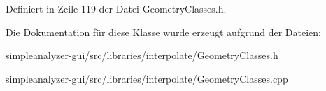 Definiert in Zeile 119 der Datei Geometry\-Classes.\-h.



Die Dokumentation für diese Klasse wurde erzeugt aufgrund der Dateien\-:\begin{DoxyCompactItemize}
\item 
simpleanalyzer-\/gui/src/libraries/interpolate/Geometry\-Classes.\-h\item 
simpleanalyzer-\/gui/src/libraries/interpolate/Geometry\-Classes.\-cpp\end{DoxyCompactItemize}
